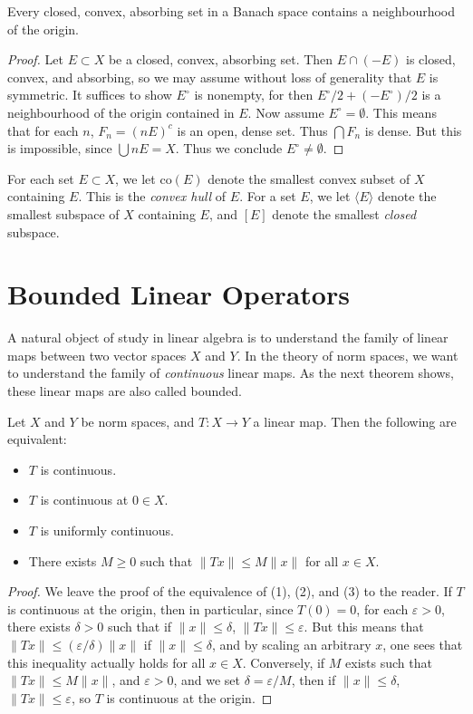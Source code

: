 \begin{theorem}
    Every closed, convex, absorbing set in a Banach space contains a neighbourhood of the origin.
\end{theorem}
\begin{proof}
    Let $E \subset X$ be a closed, convex, absorbing set. Then $E \cap (-E)$ is closed, convex, and absorbing, so we may assume without loss of generality that $E$ is symmetric. It suffices to show $E^\circ$ is nonempty, for then $E^\circ/2 + (-E^\circ)/2$ is a neighbourhood of the origin contained in $E$. Now assume $E^\circ = \emptyset$. This means that for each $n$, $F_n = (nE)^c$ is an open, dense set. Thus $\bigcap F_n$ is dense. But this is impossible, since $\bigcup nE = X$. Thus we conclude $E^\circ \neq \emptyset$.
\end{proof}

For each set $E \subset X$, we let $\text{co}(E)$ denote the smallest convex subset of $X$ containing $E$. This is the {\it convex hull} of $E$. For a set $E$, we let $\langle E \rangle$ denote the smallest subspace of $X$ containing $E$, and $[E]$ denote the smallest {\it closed} subspace.

\section{Bounded Linear Operators}

A natural object of study in linear algebra is to understand the family of linear maps between two vector spaces $X$ and $Y$. In the theory of norm spaces, we want to understand the family of {\it continuous} linear maps. As the next theorem shows, these linear maps are also called bounded.

\begin{theorem}
    Let $X$ and $Y$ be norm spaces, and $T: X \to Y$ a linear map. Then the following are equivalent:
    \begin{itemize}
        \item $T$ is continuous.
        \item $T$ is continuous at $0 \in X$.
        \item $T$ is uniformly continuous.
        \item There exists $M \geq 0$ such that $\| Tx \| \leq M \| x \|$ for all $x \in X$.
    \end{itemize}
\end{theorem}
\begin{proof}
    We leave the proof of the equivalence of (1), (2), and (3) to the reader. If $T$ is continuous at the origin, then in particular, since $T(0) = 0$, for each $\varepsilon > 0$, there exists $\delta > 0$ such that if $\| x \| \leq \delta$, $\| Tx \| \leq \varepsilon$. But this means that $\| Tx \| \leq (\varepsilon / \delta) \| x \|$ if $\| x \| \leq \delta$, and by scaling an arbitrary $x$, one sees that this inequality actually holds for all $x \in X$. Conversely, if $M$ exists such that $\| Tx \| \leq M \| x \|$, and $\varepsilon > 0$, and we set $\delta = \varepsilon / M$, then if $\| x \| \leq \delta$, $\| Tx \| \leq \varepsilon$, so $T$ is continuous at the origin.
\end{proof}

